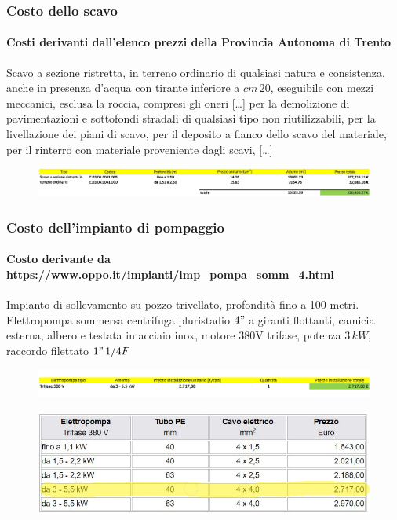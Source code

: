 \documentclass{beamer}
\newcommand{\nologo}{\setbeamertemplate{logo}{}}
\begin{document}
%
{\nologo
\begin{frame}
	\frametitle{Costo dello scavo}
	\framesubtitle{Costi derivanti dall'elenco prezzi della Provincia Autonoma di Trento}
	Scavo a sezione ristretta, in terreno ordinario di qualsiasi natura e consistenza, anche in presenza d'acqua con tirante inferiore a $cm\,20$, eseguibile con mezzi meccanici, esclusa la roccia, compresi gli oneri [\dots] per la demolizione di pavimentazioni e sottofondi stradali di qualsiasi tipo non riutilizzabili, per la livellazione dei piani di scavo, per il deposito a fianco dello scavo del materiale, per il rinterro con materiale proveniente dagli scavi, [\dots]
	\begin{figure}
	 \centering
	 \includegraphics[width=\textwidth]{images/costo_scavo}
	\end{figure}
\end{frame}
}
%
\begin{frame}
	\frametitle{Costo dell'impianto di pompaggio}
	\framesubtitle{Costo derivante da \url{https://www.oppo.it/impianti/imp_pompa_somm_4.html}}
	Impianto di sollevamento su pozzo trivellato, profondità fino a 100 metri.\\
	Elettropompa sommersa centrifuga pluristadio $4"$ a giranti flottanti, camicia esterna, albero e testata in acciaio inox, motore 380V trifase, potenza $3\,kW$, raccordo filettato $1"\,1/4 F$
	\begin{figure}
	 \centering
	 \includegraphics[width=\textwidth]{images/costo_impianto_pompa}
	\end{figure}
%
	\begin{figure}
	 \centering
	 \includegraphics[width=.5\textwidth]{images/costo_installazione_pompa}
	\end{figure}
\end{frame}
%
\end{document}
